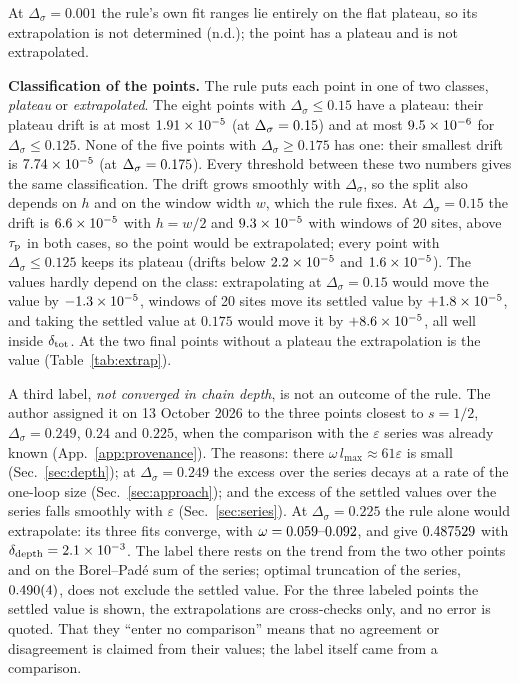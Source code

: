 \documentclass[10pt,a4paper]{article}
\newcommand{\Ds}{\Delta_\sigma}
\newcommand{\dd}{\delta_{\rm depth}}
\newcommand{\dtot}{\delta_{\rm tot}}
\begin{document}
At $\Ds=0.001$ the rule's own fit ranges lie entirely on the flat plateau, so its extrapolation is not determined (n.d.); the point
has a plateau and is not extrapolated.

\textbf{Classification of the points.} The rule puts each point in one of two classes, \emph{plateau} or \emph{extrapolated}. The eight
points with $\Ds\le0.15$ have a plateau: their plateau drift is at most $1.91\times10^{-5}$ (at $\Ds=\nrgdriftMaxPlateauAt$) and at
most $9.5\times10^{-6}$ for $\Ds\le0.125$. None of the five points with $\Ds\ge0.175$ has one: their smallest drift is
$7.74\times10^{-5}$ (at $\Ds=\nrgdriftMinNoPlateauAt$). Every threshold between these two numbers gives the same classification.
The drift grows smoothly with $\Ds$, so the split also depends on $h$ and on the window width $w$, which the rule fixes. At $\Ds=0.15$
the drift is $6.6\times10^{-5}$ with $h=w/2$ and $9.3\times10^{-5}$ with windows of 20 sites, above $\tau_{\rm p}$ in both
cases, so the point would be extrapolated; every point with $\Ds\le0.125$ keeps its plateau (drifts below $2.2\times10^{-5}$ and
$1.6\times10^{-5}$). The values hardly depend on the class: extrapolating at $\Ds=0.15$ would move the value by $-1.3\times10^{-5}$,
windows of 20 sites move its settled value by $+1.8\times10^{-5}$, and taking the settled value at $0.175$ would move it by
$+8.6\times10^{-5}$, all well inside $\dtot$. At the two final points without a plateau the extrapolation is the value
(Table~\ref{tab:extrap}).

A third label, \emph{not converged in chain depth}, is not an outcome of the rule. The author assigned it on 13 October 2026 to the
three points closest to $s=1/2$, $\Ds=0.249$, $0.24$ and $0.225$, when the comparison with the $\varepsilon$ series was already known
(App.~\ref{app:provenance}). The reasons: there $\omega\,l_{\max}\approx61\varepsilon$ is small (Sec.~\ref{sec:depth}); at
$\Ds=0.249$ the excess over the series decays at a rate of the one-loop size (Sec.~\ref{sec:approach}); and the excess of the settled
values over the series falls smoothly with $\varepsilon$ (Sec.~\ref{sec:series}). At $\Ds=0.225$ the rule alone would extrapolate: its
three fits converge, with $\omega=0.059\text{--}0.092$, and give $0.487529$ with $\dd=\nrgruleDepthTwoTwentyFive$.
The label there rests on the trend from the two other points and on the Borel--Pad\'e sum of the series; optimal truncation of the
series, $0.490(4)$, does not exclude the settled value. For the three labeled points the settled value is shown, the
extrapolations are cross-checks only, and no error is quoted. That they ``enter no comparison'' means that no agreement or
disagreement is claimed from their values; the label itself came from a comparison.
\end{document}
